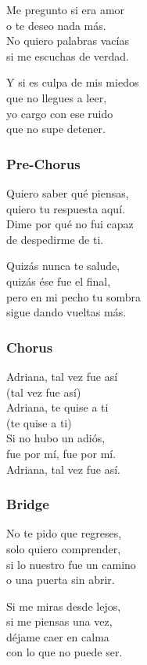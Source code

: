 Me pregunto si era amor\\
o te deseo nada más.\\
No quiero palabras vacías\\
si me escuchas de verdad.

Y si es culpa de mis miedos\\
que no llegues a leer,\\
yo cargo con ese ruido\\
que no supe detener.

\subsubsection{Pre-Chorus}\label{pre-chorus-24}

Quiero saber qué piensas,\\
quiero tu respuesta aquí.\\
Dime por qué no fui capaz\\
de despedirme de ti.

Quizás nunca te salude,\\
quizás ése fue el final,\\
pero en mi pecho tu sombra\\
sigue dando vueltas más.

\subsubsection{Chorus}\label{chorus-43}

Adriana, tal vez fue así\\
(tal vez fue así)\\
Adriana, te quise a ti\\
(te quise a ti)\\
Si no hubo un adiós,\\
fue por mí, fue por mí.\\
Adriana, tal vez fue así.

\subsubsection{Bridge}\label{bridge-15}

No te pido que regreses,\\
solo quiero comprender,\\
si lo nuestro fue un camino\\
o una puerta sin abrir.

Si me miras desde lejos,\\
si me piensas una vez,\\
déjame caer en calma\\
con lo que no puede ser.

